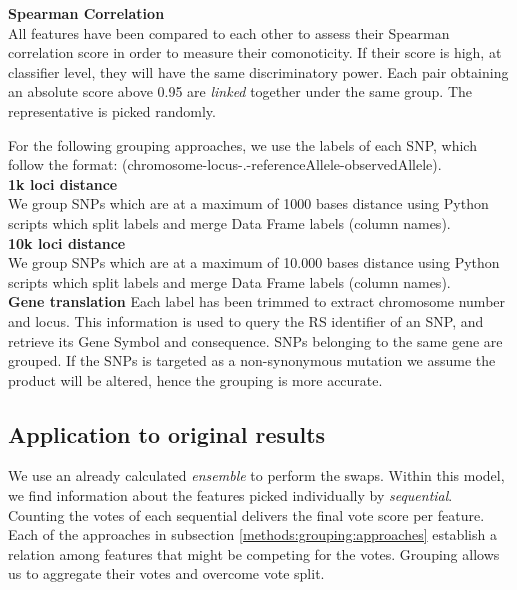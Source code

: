 \textbf{Spearman Correlation}\\
All features have been compared to each other to assess their Spearman correlation score in order to measure their comonoticity. If their score is high, at classifier level, they will have the same discriminatory power. Each pair obtaining an absolute score above 0.95 are \emph{linked} together under the same group. The representative is picked randomly.

For the following grouping approaches, we use the labels of each SNP, which follow the format: (chromosome-locus-.-referenceAllele-observedAllele).
\\

\textbf{1k loci distance}\\
We group SNPs which are at a maximum of 1000 bases distance using Python scripts which split labels and merge Data Frame labels (column names).
\\

\textbf{10k loci distance}\\
We group SNPs which are at a maximum of 10.000 bases distance using Python scripts which split labels and merge Data Frame labels (column names).
\\

\textbf{Gene translation}
Each label has been trimmed to extract chromosome number and locus. This information is used to query the RS identifier of an SNP, and retrieve its Gene Symbol and consequence. SNPs belonging to the same gene are grouped. If the SNPs is targeted as a non-synonymous mutation we assume the product will be altered, hence the grouping is more accurate.

\subsection{Application to original results}
We use an already calculated \emph{ensemble} to perform the swaps. Within this model, we find information about the features picked individually by \emph{sequential}. Counting the votes of each sequential delivers the final vote score per feature.
\\

Each of the approaches in subsection \ref{methods:grouping:approaches} establish a relation among features that might be competing for the votes. Grouping allows us to aggregate their votes and overcome vote split.